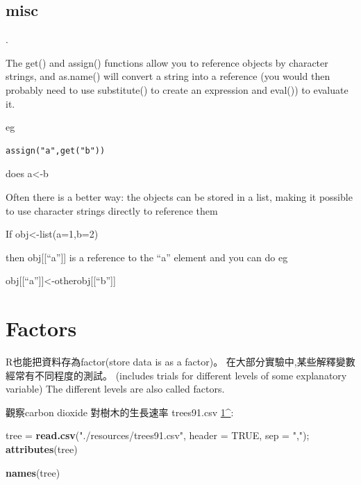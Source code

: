 \documentclass[]{book}
\newenvironment{Shaded}{\begin{snugshade}}{\end{snugshade}}
\newcommand{\KeywordTok}[1]{\textcolor[rgb]{0.13,0.29,0.53}{\textbf{#1}}}
\newcommand{\DataTypeTok}[1]{\textcolor[rgb]{0.13,0.29,0.53}{#1}}
\newcommand{\StringTok}[1]{\textcolor[rgb]{0.31,0.60,0.02}{#1}}
\newcommand{\OtherTok}[1]{\textcolor[rgb]{0.56,0.35,0.01}{#1}}
\newcommand{\NormalTok}[1]{#1}
\theoremstyle{definition}
\theoremstyle{definition}
\theoremstyle{definition}
\theoremstyle{remark}
\begin{document}
\subsection{misc}\label{misc}

.

The get() and assign() functions allow you to reference objects by
character strings, and as.name() will convert a string into a reference
(you would then probably need to use substitute() to create an
expression and eval()) to evaluate it.

eg

\begin{verbatim}
assign("a",get("b"))
\end{verbatim}

does a\textless{}-b

Often there is a better way: the objects can be stored in a list, making
it possible to use character strings directly to reference them

If obj\textless{}-list(a=1,b=2)

then obj{[}{[}``a''{]}{]} is a reference to the ``a'' element and you
can do eg

obj{[}{[}``a''{]}{]}\textless{}-otherobj{[}{[}``b''{]}{]}

\section{Factors}\label{factors}

R也能把資料存為factor(store data is as a factor)。
在大部分實驗中,某些解釋變數經常有不同程度的測試。 (includes trials for
different levels of some explanatory variable) The different levels are
also called factors.

觀察carbon dioxide 對樹木的生長速率 trees91.csv
\href{The\%20original\%20spreadsheet\%20is\%20located\%20at\%20http://cdiac.ornl.gov/ftp/ndp061a/trees91.wk1.}{1\^{}}:

\begin{Shaded}
\begin{Highlighting}[]
\NormalTok{tree =}\StringTok{ }\KeywordTok{read.csv}\NormalTok{(}\StringTok{"./resources/trees91.csv"}\NormalTok{, }\DataTypeTok{header =} \OtherTok{TRUE}\NormalTok{, }\DataTypeTok{sep =} \StringTok{","}\NormalTok{);}
\KeywordTok{attributes}\NormalTok{(tree)}
\end{Highlighting}
\end{Shaded}

\begin{Shaded}
\begin{Highlighting}[]
\KeywordTok{names}\NormalTok{(tree)}
\end{Highlighting}
\end{Shaded}
\end{document}
